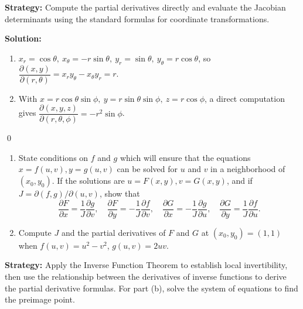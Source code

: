 \noindent\textbf{Strategy:} Compute the partial derivatives directly and evaluate the Jacobian determinants using the standard formulas for coordinate transformations.

\bigskip\noindent\textbf{Solution:}
\begin{enumerate}[label=(\alph*)]
    \item $x_r=\cos\theta,\ x_\theta=-r\sin\theta,\ y_r=\sin\theta,\ y_\theta=r\cos\theta$, so
    $\dfrac{\partial(x,y)}{\partial(r,\theta)}=x_r y_\theta-x_\theta y_r=r$.
    \item With $x=r\cos\theta\sin\phi,\ y=r\sin\theta\sin\phi,\ z=r\cos\phi$, a direct computation gives
    $\dfrac{\partial(x,y,z)}{\partial(r,\theta,\phi)}=-r^2\sin\phi$.
\end{enumerate}\qed


\begin{problembox}
\begin{problemstatement}
\begin{enumerate}[label=(\alph*)]
    \item State conditions on \( f \) and \( g \) which will ensure that the equations \( x = f(u, v), y = g(u, v) \) can be solved for \( u \) and \( v \) in a neighborhood of \( (x_0, y_0) \). If the solutions are \( u = F(x, y), v = G(x, y) \), and if \( J = \partial (f, g)/\partial (u, v) \), show that
    \[\frac{\partial F}{\partial x} = \frac{1}{J} \frac{\partial g}{\partial v}, \quad \frac{\partial F}{\partial y} = -\frac{1}{J} \frac{\partial f}{\partial v}, \quad \frac{\partial G}{\partial x} = -\frac{1}{J} \frac{\partial g}{\partial u}, \quad \frac{\partial G}{\partial y} = \frac{1}{J} \frac{\partial f}{\partial u}.\]
    \item Compute \( J \) and the partial derivatives of \( F \) and \( G \) at \((x_0, y_0) = (1, 1)\) when \( f(u, v) = u^2 - v^2 \), \( g(u, v) = 2uv \).
\end{enumerate}
\end{problemstatement}
\end{problembox}

\noindent\textbf{Strategy:} Apply the Inverse Function Theorem to establish local invertibility, then use the relationship between the derivatives of inverse functions to derive the partial derivative formulas. For part (b), solve the system of equations to find the preimage point.


